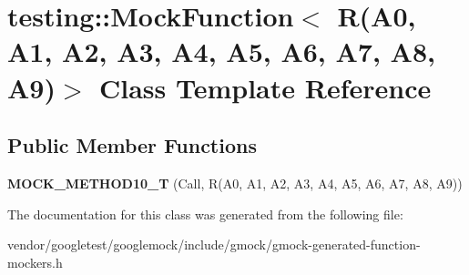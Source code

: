 \hypertarget{classtesting_1_1MockFunction_3_01R_07A0_00_01A1_00_01A2_00_01A3_00_01A4_00_01A5_00_01A6_00_01A7_00_01A8_00_01A9_08_4}{}\section{testing\+:\+:Mock\+Function$<$ R(A0, A1, A2, A3, A4, A5, A6, A7, A8, A9)$>$ Class Template Reference}
\label{classtesting_1_1MockFunction_3_01R_07A0_00_01A1_00_01A2_00_01A3_00_01A4_00_01A5_00_01A6_00_01A7_00_01A8_00_01A9_08_4}
\subsection*{Public Member Functions}
\begin{DoxyCompactItemize}
\item 
{\bfseries M\+O\+C\+K\+\_\+\+M\+E\+T\+H\+O\+D10\+\_\+T} (Call, R(A0, A1, A2, A3, A4, A5, A6, A7, A8, A9))\hypertarget{classtesting_1_1MockFunction_3_01R_07A0_00_01A1_00_01A2_00_01A3_00_01A4_00_01A5_00_01A6_00_01A7_00_01A8_00_01A9_08_4_adb493fcbb4936734eda9cf99b4d0acd0}{}\label{classtesting_1_1MockFunction_3_01R_07A0_00_01A1_00_01A2_00_01A3_00_01A4_00_01A5_00_01A6_00_01A7_00_01A8_00_01A9_08_4_adb493fcbb4936734eda9cf99b4d0acd0}

\end{DoxyCompactItemize}


The documentation for this class was generated from the following file\+:\begin{DoxyCompactItemize}
\item 
vendor/googletest/googlemock/include/gmock/gmock-\/generated-\/function-\/mockers.\+h\end{DoxyCompactItemize}
